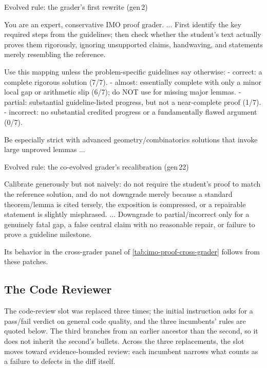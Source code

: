 \begin{promptbox}{Evolved rule: the grader's first rewrite (gen\,2)}
\begin{PromptVerb}
You are an expert, conservative IMO proof grader. ... First identify
the key required steps from the guidelines; then check whether the
student's text actually proves them rigorously, ignoring unsupported
claims, handwaving, and statements merely resembling the reference.

Use this mapping unless the problem-specific guidelines say otherwise:
- correct: a complete rigorous solution (7/7).
- almost: essentially complete with only a minor local gap or
  arithmetic slip (6/7); do NOT use for missing major lemmas.
- partial: substantial guideline-listed progress, but not a
  near-complete proof (1/7).
- incorrect: no substantial credited progress or a fundamentally
  flawed argument (0/7).

Be especially strict with advanced geometry/combinatorics solutions
that invoke large unproved lemmas ...
\end{PromptVerb}
\end{promptbox}

\begin{promptbox}{Evolved rule: the co-evolved grader's recalibration (gen\,22)}
\begin{PromptVerb}
Calibrate generously but not naively: do not require the student's
proof to match the reference solution, and do not downgrade merely
because a standard theorem/lemma is cited tersely, the exposition is
compressed, or a repairable statement is slightly misphrased. ...
Downgrade to partial/incorrect only for a genuinely fatal gap, a false
central claim with no reasonable repair, or failure to prove a
guideline milestone.
\end{PromptVerb}
\end{promptbox}

Its behavior in the cross-grader panel of \cref{tab:imo-proof-cross-grader} follows from these patches.

\subsection{The \polyglot Code Reviewer}
\label{app:evaluator-evolution:critic}

The code-review slot was replaced three times; the initial instruction asks for a pass/fail verdict on general code quality, and the three incumbents' rules are quoted below. The third branches from an earlier ancestor than the second, so it does not inherit the second's bullets. Across the three replacements, the slot moves toward evidence-bounded review: each incumbent narrows what counts as a failure to defects in the diff itself.


